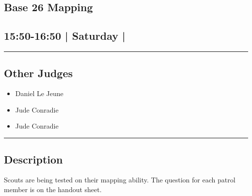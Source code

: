 \documentclass[10pt, A5]{article}
\begin{document}
		\begin{framed}
			\begin{minipage}{\textwidth}

			\setcounter{section}{58}
							\section{\faStar \: Base 26 \faStar \: Mapping}
						
			\subsection*{15:50-16:50 | Saturday | }

			\vspace{0.25cm}
			\hrule
			\vspace{0.25cm}


			\subsection*{Other Judges}
							

				\begin{multicols}{2}

			\begin{itemize}
											\item Daniel Le Jeune
											\item Jude Conradie
								\end{itemize}

			\vfill\null
			\columnbreak

			\begin{itemize}
											\item Jude Conradie
								\end{itemize}

			\vfill\null

			\end{multicols}

			\vspace{0.25cm}
			\hrule
			\vspace{0.25cm}

			\begin{minipage}{\textwidth}
			\subsection*{\faListAlt \: Description}
			Scouts are being tested on their mapping ability. The question for each patrol member is on the handout sheet.
			\end{minipage}


	\end{minipage}
	\end{framed}
\end{document}
